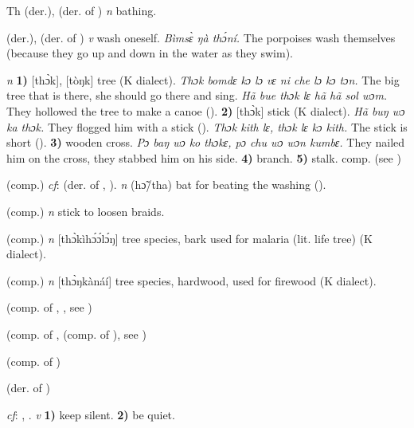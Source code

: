 \begin{letter}{Th}
 (der.), (der. of ) \textit{n} bathing.

 (der.), (der. of ) \textit{v} wash oneself. \textit{Bìmsɛ̀ ŋà thɔ́ní.} The porpoises wash themselves (because they go up and down in the water as they swim). 

 \textit{n} \textbf{1)} [thɔ̀k], [tòŋk] tree (K dialect). \textit{Thɔk bomdɛ kɔ lɔ vɛ ni che lɔ kɔ tɔn.} The big tree that is there, she should go there and sing. \textit{Hã bue thɔk lɛ hã hã sol wɔm.} They hollowed the tree to make a canoe (\citealt{Pichl1967}). \textbf{2)} [thɔ̀k] stick (K dialect). \textit{Hã buŋ wɔ ka thɔk.} They flogged him with a stick (\citealt{Pichl1967}). \textit{Thɔk kith lɛ, thɔk lɛ kɔ kith.} The stick is short (\citealt{Pichl1967}). \textbf{3)} wooden cross. \textit{Pɔ baŋ wɔ ko thɔkɛ, pɔ chu wɔ wɔn kumbɛ.} They nailed him on the cross, they stabbed him on his side. \textbf{4)} branch. \textbf{5)} stalk. comp.  (see ) 

 (comp.) \textit{cf}:  (der. of , ). \textit{n} (hɔ̃/tha) bat for beating the washing (\citealt{Pichl1967}). 

 (comp.) \textit{n} stick to loosen braids.

 (comp.) \textit{n} [thɔ̀kìhɔ́ɔ́lɔ́ŋ] tree species, bark used for malaria (lit. life tree) (K dialect). 

 (comp.) \textit{n} [thɔ̀ŋkànáí] tree species, hardwood, used for firewood (K dialect). 

 (comp. of , , see ) 

 (comp. of ,  (comp. of ), see ) 

 (comp. of ) 

 (der. of ) 

 \textit{cf}: , . \textit{v} \textbf{1)} keep silent. \textbf{2)} be quiet.


\end{letter}

